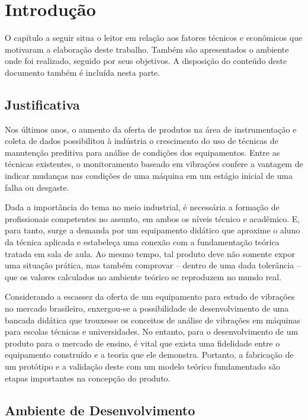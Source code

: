 \documentclass[12pt,openright,twoside,a4paper,
	chapter=TITLE,section=TITLE,
	english,brazil]{abntex2}
\begin{document}
	
	\textual %
	

	\chapter{Introdução}
	O capítulo a seguir situa o leitor em relação aos fatores técnicos e econômicos que motivaram a elaboração deste trabalho. Também são apresentados o ambiente onde foi realizado, seguido por seus objetivos. A disposição do conteúdo deste documento também é incluída nesta parte.
	
	\section{Justificativa}
	
	Nos últimos anos, o aumento da oferta de produtos na área de instrumentação e coleta de dados possibilitou à indústria o crescimento do uso de técnicas de manutenção preditiva para análise de condições dos equipamentos. Entre as técnicas existentes, o monitoramento baseado em vibrações confere a vantagem de indicar mudanças nas condições de uma máquina em um estágio inicial de uma falha ou desgaste\cite{bib:al-najjar}.
	
	Dada a importância do tema no meio industrial, é necessária a formação de profissionais competentes no assunto, em ambos os níveis técnico e acadêmico. E, para tanto, surge a demanda por um equipamento didático que aproxime o aluno da técnica aplicada e estabeleça uma conexão com a fundamentação teórica tratada em sala de aula. Ao mesmo tempo, tal produto deve não somente expor uma situação prática, mas também comprovar -- dentro de uma dada tolerância -- que os valores calculados no ambiente teórico se reproduzem no mundo real.
	
	Considerando a escassez da oferta de um equipamento para estudo de vibrações no mercado brasileiro, enxergou-se a possibilidade de desenvolvimento de uma bancada didática que trouxesse os conceitos de análise de vibrações em máquinas para escolas técnicas e universidades. No entanto, para o desenvolvimento de um produto para o mercado de ensino, é vital que exista uma fidelidade entre o equipamento construído e a teoria que ele demonstra. Portanto, a fabricação de um protótipo e a validação deste com um modelo teórico fundamentado são etapas importantes na concepção do produto.
	
	\section{Ambiente de Desenvolvimento}
	
\end{document}
